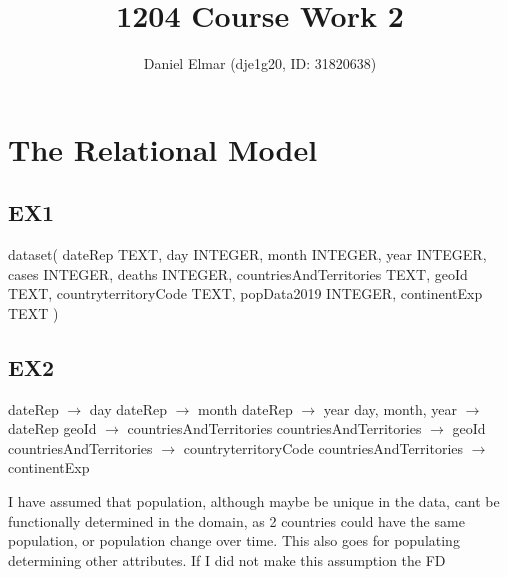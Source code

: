 \documentclass{report}
\title{1204 Course Work 2}
\author{Daniel Elmar (dje1g20,  ID: 31820638)}
\begin{document}
	
	\maketitle
	\setlength{\parindent}{0cm}
	\section{The Relational Model}
	
	\subsection{EX1}
	dataset(\newline
	dateRep TEXT,\newline
	day INTEGER,\newline
	month INTEGER,\newline
	year INTEGER,\newline
	cases INTEGER,\newline
	deaths INTEGER,\newline
	countriesAndTerritories TEXT,\newline
	geoId TEXT,\newline
	countryterritoryCode TEXT,\newline
	popData2019 INTEGER,\newline
	continentExp TEXT\newline
	)\newline
	\newline
	
	
	
	\subsection{EX2}	
	dateRep $\rightarrow$ day \newline
	dateRep $\rightarrow$ month \newline
	dateRep $\rightarrow$ year \newline
	day, month, year $\rightarrow$ dateRep \newline
	geoId $\rightarrow$ countriesAndTerritories \newline
	countriesAndTerritories $\rightarrow$ geoId \newline
	countriesAndTerritories $\rightarrow$ countryterritoryCode \newline
	countriesAndTerritories $\rightarrow$ continentExp \newline
	
	I have assumed that population, although maybe be unique in the data, cant be functionally determined in the domain, as 2 countries could have the same population, or population change over time. This also goes for populating determining other attributes. If I did not make this assumption the FD\newline
	
\end{document}
